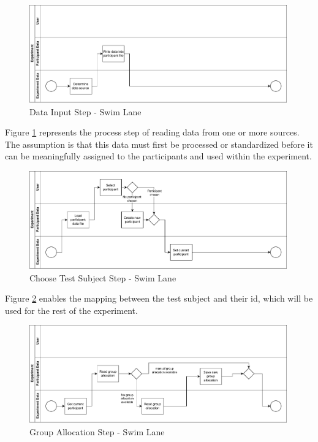 \begin{figure}[htbp]
    \centering
    \includegraphics[width=0.99\textwidth, keepaspectratio]{content/05_design_and_dev_artefacts/DataInputSwimLane.drawio.pdf}
    \caption{Data Input Step - Swim Lane}    
    \label{fig:DataInputSwimLane}
\end{figure}

Figure \ref{fig:DataInputSwimLane} represents the process step of reading data from one or more sources. The assumption is that this data must first be processed or standardized before it can be meaningfully assigned to the participants and used within the experiment.

\begin{figure}[htbp]
    \centering
    \includegraphics[width=0.99\textwidth, keepaspectratio]{content/05_design_and_dev_artefacts/ChooseTestSubjectSwimLane.drawio.pdf}
    \caption{Choose Test Subject Step - Swim Lane}    
    \label{fig:ChooseTestSubjectSwimLane}
\end{figure}

Figure \ref{fig:ChooseTestSubjectSwimLane} enables the mapping between the test subject and their \ac{id}, which will be used for the rest of the experiment.

\begin{figure}[htbp]
    \centering
    \includegraphics[width=0.99\textwidth, keepaspectratio]{content/05_design_and_dev_artefacts/GroupAllocationSwimLane.drawio.pdf}
    \caption{Group Allocation Step - Swim Lane}    
    \label{fig:groupAllocationSwimLane}
\end{figure}


